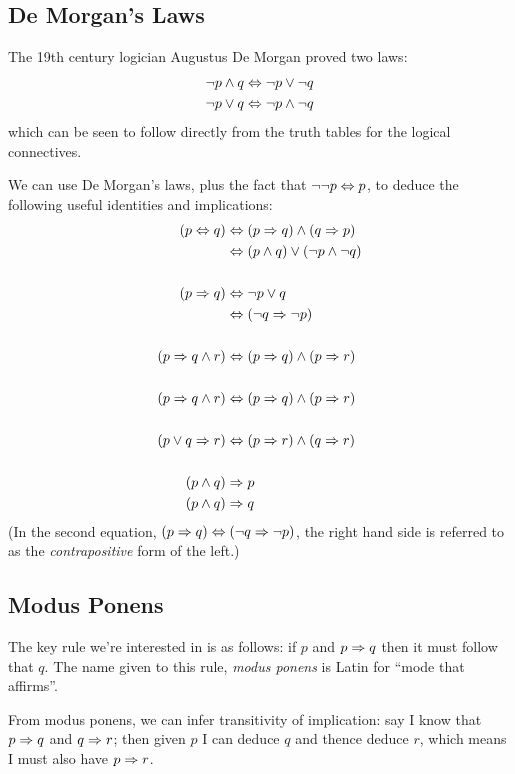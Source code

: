 \subsection{De Morgan's Laws}

The 19th century logician Augustus De Morgan proved two laws:
\begin{align*}
\neg{}p \wedge q
& \Leftrightarrow \neg{}p \vee \neg{}q \\
\neg{}p \vee q
& \Leftrightarrow \neg{}p \wedge \neg{}q
\end{align*}
which can be seen to follow directly from the truth tables for the
logical connectives.

We can use De Morgan's laws, plus the fact that $\neg{}\neg{}p \Leftrightarrow p$,
to deduce the following useful identities and implications:
\begin{align*}
(p \Leftrightarrow q)
& \Leftrightarrow (p \Rightarrow q) \wedge (q \Rightarrow p) \\
& \Leftrightarrow (p \wedge q) \vee (\neg{}p \wedge \neg{}q) \\
\\
(p \Rightarrow q)
& \Leftrightarrow \neg{}p \vee q \\
& \Leftrightarrow (\neg{}q \Rightarrow \neg{}p) \\
\\
(p \Rightarrow q \wedge r)
& \Leftrightarrow (p \Rightarrow q) \wedge (p \Rightarrow r) \\
\\
(p \Rightarrow q \wedge r)
& \Leftrightarrow (p \Rightarrow q) \wedge (p \Rightarrow r) \\
\\
(p \vee q \Rightarrow r)
& \Leftrightarrow (p \Rightarrow r) \wedge (q \Rightarrow r) \\
\\
(p \wedge q)
& \Rightarrow p \\
(p \wedge q)
& \Rightarrow q \\
\end{align*}
(In the second equation, $(p \Rightarrow q) \Leftrightarrow (\neg{}q \Rightarrow \neg{}p)$, the
right hand side is referred to as the \emph{contrapositive} form of the
left.)

\subsection{Modus Ponens}

The key rule we're interested in is as follows: if $p$ and $p \Rightarrow q$
then it must follow that $q$.  The name given to this rule, \emph{modus
ponens} is Latin for ``mode that affirms''.

From modus ponens, we can infer transitivity of implication: say I know
that $p \Rightarrow q$ and $q \Rightarrow r$; then given $p$ I can deduce $q$ and
thence deduce $r$, which means I must also have $p \Rightarrow r$.

